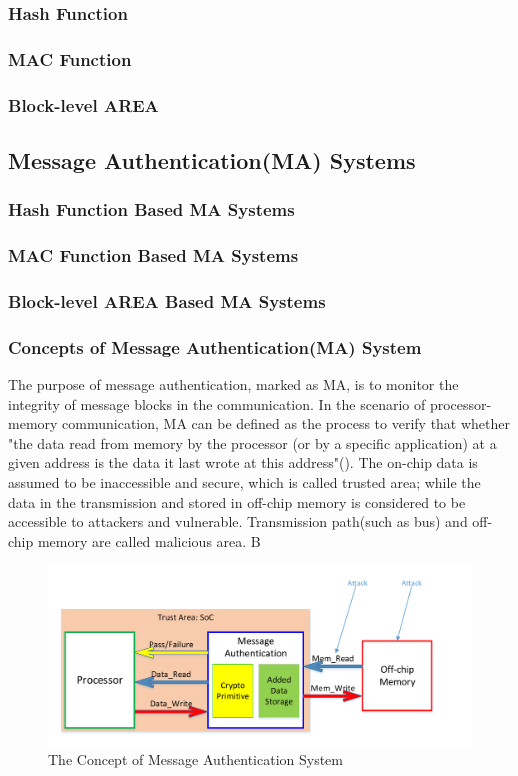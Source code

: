 \documentclass{article}
\begin{document}
\subsubsection{Hash Function}
\subsubsection{MAC Function}
\subsubsection{Block-level AREA}

\subsection{Message Authentication(MA) Systems}
\subsubsection{Hash Function Based MA Systems}
\subsubsection{MAC Function Based MA Systems}
\subsubsection{Block-level AREA Based MA Systems}



\subsubsection{Concepts of Message Authentication(MA) System}
The purpose of message authentication, marked as MA, is to monitor the integrity of message blocks in the communication. In the scenario of processor-memory communication, MA can be defined as the process to verify that whether "the data read from memory by the processor (or by a specific application) at a given address is the data it last wrote at this address"(\cite{hm_survey}). The on-chip data is assumed to be inaccessible and secure, which is called trusted area; while the data in the transmission and stored in off-chip memory is considered to be accessible to attackers and vulnerable. Transmission path(such as bus) and off-chip memory are called malicious area. 
B\begin{figure}[htbp]
\centering
\includegraphics[scale=0.4]{./diagrams/MA_concept.pdf}
\caption{The Concept of Message Authentication System}
\label{fig:1 }
\end{figure}
\end{document}
